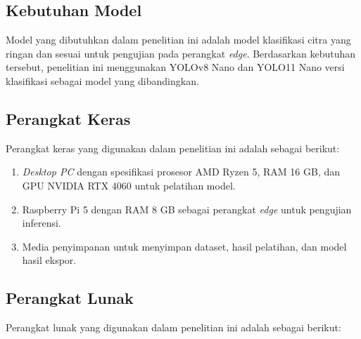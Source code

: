 \begin{sectioncontent}
    \subsection{Kebutuhan Model}
    \begin{subsectioncontent}
        \hspace{\parindent}Model yang dibutuhkan dalam penelitian ini adalah model klasifikasi citra yang ringan dan sesuai untuk pengujian pada perangkat \textit{edge}. Berdasarkan kebutuhan tersebut, penelitian ini menggunakan YOLOv8 Nano dan YOLO11 Nano versi klasifikasi sebagai model yang dibandingkan.
    \end{subsectioncontent}

    \subsection{Perangkat Keras}
    \begin{subsectioncontent}
        \hspace{\parindent}Perangkat keras yang digunakan dalam penelitian ini adalah sebagai berikut:

        \begin{enumerate}[leftmargin=0.75cm,label=\arabic*.]
            \item \textit{Desktop PC} dengan spesifikasi prosesor AMD Ryzen 5, RAM 16 GB, dan GPU NVIDIA RTX 4060 untuk pelatihan model.
            \item Raspberry Pi 5 dengan RAM 8 GB sebagai perangkat \textit{edge} untuk pengujian inferensi.
            \item Media penyimpanan untuk menyimpan dataset, hasil pelatihan, dan model hasil ekspor.
        \end{enumerate}
    \end{subsectioncontent}

    \subsection{Perangkat Lunak}
    \begin{subsectioncontent}
        \hspace{\parindent}Perangkat lunak yang digunakan dalam penelitian ini adalah sebagai berikut:


\end{subsectioncontent}
\end{sectioncontent}
